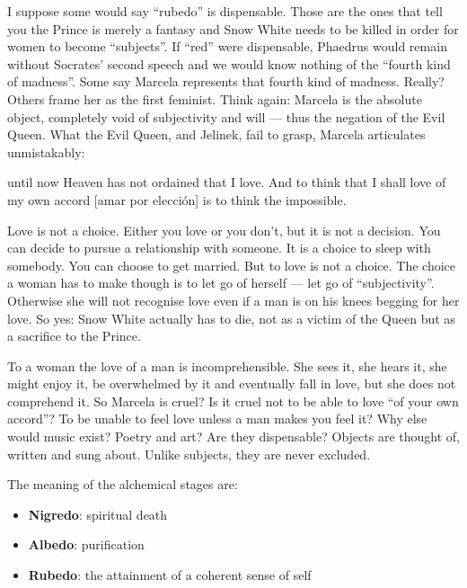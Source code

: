 I suppose some would say “rubedo” is dispensable. Those are the ones that tell you the Prince is merely a fantasy and Snow White needs to be killed in order for women to become “subjects”. If “red” were dispensable, Phaedrus would remain without Socrates' second speech and we would know nothing of the “fourth kind of madness”. Some say Marcela represents that fourth kind of madness. Really? Others frame her as the first feminist. Think again: Marcela is the absolute object, completely void of subjectivity and will — thus the negation of the Evil Queen. What the Evil Queen, and Jelinek, fail to grasp, Marcela articulates unmistakably:

\begin{quotex}
until now Heaven has not ordained that I love. And to think that I shall love of my own accord [amar por elección] is to think the impossible. 

\end{quotex}
Love is not a choice. Either you love or you don't, but it is not a decision. You can decide to pursue a relationship with someone. It is a choice to sleep with somebody. You can choose to get married. But to love is not a choice. The choice a woman has to make though is to let go of herself — let go of “subjectivity”. Otherwise she will not recognise love even if a man is on his knees begging for her love. So yes: Snow White actually has to die, not as a victim of the Queen but as a sacrifice to the Prince.

To a woman the love of a man is incomprehensible. She sees it, she hears it, she might enjoy it, be overwhelmed by it and eventually fall in love, but she does not comprehend it. So Marcela is cruel? Is it cruel not to be able to love “of your own accord”? To be unable to feel love unless a man makes you feel it? Why else would music exist? Poetry and art? Are they dispensable? Objects are thought of, written and sung about. Unlike subjects, they are never excluded.


\hfill

The meaning of the alchemical stages are:

\begin{itemize}
\item \textbf{Nigredo}: spiritual death 
\item \textbf{Albedo}: purification 
\item \textbf{Rubedo}: the attainment of a coherent sense of self 
\end{itemize}


